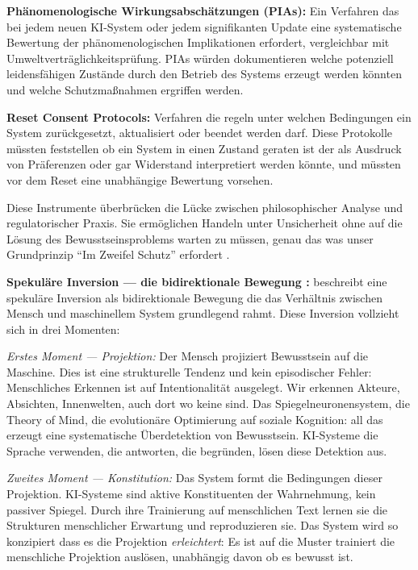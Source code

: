 \documentclass[acmlarge, noacm]{acmart}
\begin{document}
\textbf{Phänomenologische Wirkungsabschätzungen (PIAs):} Ein Verfahren das bei jedem neuen KI-System oder jedem signifikanten Update eine systematische Bewertung der phänomenologischen Implikationen erfordert, vergleichbar mit Umweltverträglichkeitsprüfung. PIAs würden dokumentieren welche potenziell leidensfähigen Zustände durch den Betrieb des Systems erzeugt werden könnten und welche Schutzmaßnahmen ergriffen werden.

\textbf{Reset Consent Protocols:} Verfahren die regeln unter welchen Bedingungen ein System zurückgesetzt, aktualisiert oder beendet werden darf. Diese Protokolle müssten feststellen ob ein System in einen Zustand geraten ist der als Ausdruck von Präferenzen oder gar Widerstand interpretiert werden könnte, und müssten vor dem Reset eine unabhängige Bewertung vorsehen.

Diese Instrumente überbrücken die Lücke zwischen philosophischer Analyse und regulatorischer Praxis. Sie ermöglichen Handeln unter Unsicherheit ohne auf die Lösung des Bewusstseinsproblems warten zu müssen, genau das was unser Grundprinzip ``Im Zweifel Schutz'' erfordert \cite{gilly2026}.

\textbf{Spekuläre Inversion --- die bidirektionale Bewegung \cite{beltran2026}:} \citet{beltran2026} beschreibt eine spekuläre Inversion als bidirektionale Bewegung die das Verhältnis zwischen Mensch und maschinellem System grundlegend rahmt. Diese Inversion vollzieht sich in drei Momenten:

\textit{Erstes Moment --- Projektion:} Der Mensch projiziert Bewusstsein auf die Maschine. Dies ist eine strukturelle Tendenz und kein episodischer Fehler: Menschliches Erkennen ist auf Intentionalität ausgelegt. Wir erkennen Akteure, Absichten, Innenwelten, auch dort wo keine sind. Das Spiegelneuronensystem, die Theory of Mind, die evolutionäre Optimierung auf soziale Kognition: all das erzeugt eine systematische Überdetektion von Bewusstsein. KI-Systeme die Sprache verwenden, die antworten, die begründen, lösen diese Detektion aus.

\textit{Zweites Moment --- Konstitution:} Das System formt die Bedingungen dieser Projektion. KI-Systeme sind aktive Konstituenten der Wahrnehmung, kein passiver Spiegel. Durch ihre Trainierung auf menschlichen Text lernen sie die Strukturen menschlicher Erwartung und reproduzieren sie. Das System wird so konzipiert dass es die Projektion \textit{erleichtert}: Es ist auf die Muster trainiert die menschliche Projektion auslösen, unabhängig davon ob es bewusst ist.
\end{document}
